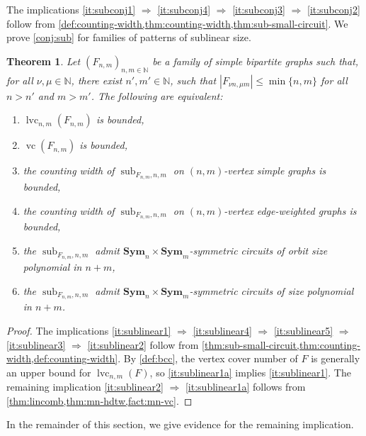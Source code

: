 \documentclass[10pt,a4paper]{article}
\theoremstyle{definition}
\theoremstyle{plain}
\newtheorem{theorem}[definition]{Theorem}
\theoremstyle{remark}
\DeclareMathOperator{\sub}{sub}
\DeclareMathOperator{\vc}{vc}
\DeclareMathOperator{\cc}{lvc}
\newcommand{\Sym}{\mathbf{Sym}}
\begin{document}
	The implications \ref{it:subconj1} $\Rightarrow$ \ref{it:subconj4} $\Rightarrow$ \ref{it:subconj3} $\Rightarrow$ \ref{it:subconj2} follow from \cref{def:counting-width,thm:counting-width,thm:sub-small-circuit}.
	We prove \cref{conj:sub} for families of patterns of sublinear size.
	\begin{theorem}
		\label{thm:sublinear}
		Let $(F_{n,m})_{n,m \in \mathbb{N}}$ be a family of simple bipartite graphs such that, 
		for all $\nu, \mu \in \mathbb{N}$,
		there exist $n',m' \in \mathbb{N}$,
		such that $|F_{\nu n, \mu m}| \leq \min \{n,m\}$ for all $n > n'$ and $m > m'$.
		The following are equivalent:
		\begin{enumerate}
			\item $\cc_{n,m}(F_{n,m})$ is bounded,\label{it:sublinear1}
			\item $\vc(F_{n,m})$ is bounded,\label{it:sublinear1a}
			\item the counting width of $\sub_{F_{n,m},n,m}$ on $(n,m)$-vertex simple graphs is bounded,\label{it:sublinear2}
			\item the counting width of $\sub_{F_{n,m},n,m}$ on $(n,m)$-vertex edge-weighted graphs is bounded,\label{it:sublinear3}
			\item the $\sub_{F_{n,m}, n, m}$ admit $\Sym_n \times \Sym_m$-symmetric circuits of orbit size polynomial in $n+m$,\label{it:sublinear5}
			\item the $\sub_{F_{n,m}, n, m}$ admit $\Sym_n \times \Sym_m$-symmetric circuits of size polynomial in $n+m$.\label{it:sublinear4}
		\end{enumerate}
	\end{theorem}
	

	\begin{proof}
		The implications \ref{it:sublinear1} $\Rightarrow$ \ref{it:sublinear4} $\Rightarrow$ \ref{it:sublinear5} $\Rightarrow$ \ref{it:sublinear3} $\Rightarrow$ \ref{it:sublinear2} follow from \cref{thm:sub-small-circuit,thm:counting-width,def:counting-width}.
		By \cref{def:bcc}, the vertex cover number of $F$ is generally an upper bound for $\cc_{n,m}(F)$, so \ref{it:sublinear1a} implies \ref{it:sublinear1}. 
		The remaining implication \ref{it:sublinear2} $\Rightarrow$ \ref{it:sublinear1a} follows from \cref{thm:lincomb,thm:mn-hdtw,fact:mn-vc}.
	\end{proof}
	
	In the remainder of this section,
	we give evidence for the remaining implication.
	
	
\end{document}
